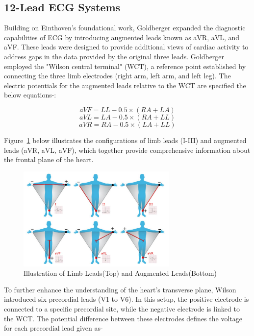 \subsection{12-Lead ECG Systems}
\vspace{1em}
\noindent Building on Einthoven's foundational work, Goldberger expanded the diagnostic capabilities of ECG by introducing augmented leads known as aVR, aVL, and aVF. These leads were designed to provide additional views of cardiac activity to address gaps in the data provided by the original three leads. Goldberger employed the "Wilson central terminal" (WCT), a reference point established by connecting the three limb electrodes (right arm, left arm, and left leg). The electric potentials for the augmented leads relative to the WCT are specified the below equations-\cite{wagner2013, malminen1995}:

\begin{equation}
	aVF = LL - 0.5 \times (RA + LA)
\end{equation}
\begin{equation}
	aVL = LA - 0.5 \times (RA + LL)
\end{equation}
\begin{equation}
	aVR = RA - 0.5 \times (LA + LL)
\end{equation}

\noindent Figure~\ref{fig:leads} below illustrates the configurations of limb leads (I-III) and augmented leads (aVR, aVL, aVF), which together provide comprehensive information about the frontal plane of the heart.

\begin{figure}[H]
	\centering
	\includegraphics[width=0.7\textwidth]{images/3lead and augumented lead}
	\caption{Illustration of Limb Leads(Top) and Augmented Leads(Bottom) \cite{wasimuddin2020}}
	\label{fig:leads}
\end{figure}

\noindent To further enhance the understanding of the heart’s transverse plane, Wilson introduced six precordial leads (V1 to V6). In this setup, the positive electrode is connected to a specific precordial site, while the negative electrode is linked to the WCT\cite{hall2015, malminen1995}. The potential difference between these electrodes defines the voltage for each precordial lead given as-

